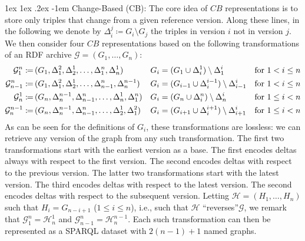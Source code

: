 \documentclass{llncs}
\makeatletter
\renewcommand\paragraph{\@startsection{paragraph}{4}{\z@}%
	{1ex \@plus1ex \@minus.2ex}%
	{-1em}%
	{\normalfont\normalsize\itshape}}
\newcommand{\da}{\ensuremath{:\nolinebreak\mkern-1.2mu\nolinebreak=}}
\makeatother
\begin{document}
\paragraph{Change-Based (CB):} The core idea of $CB$ representations is to store only triples that change from a given reference version. Along these lines, in the following we denote by $\Delta_{i}^j \coloneqq G_i \setminus G_j$ the triples in version $i$ not in version $j$. We then consider four $CB$ representations based on the following transformations of an RDF archive $\mathcal{G} = (G_1,\ldots,G_n)$:
%
{\footnotesize
\begin{align*}
\mathcal{G}^n_1 \da\,& (G_1,\Delta_1^2,\Delta_2^1,\ldots,\Delta_1^n,\Delta_n^1) & G_i & = (G_1 \cup \Delta_i^1) \setminus \Delta_1^i & \text{for }1 < i \leq n\\
\mathcal{G}^n_{n-1} \da\,& (G_1,\Delta_1^2,\Delta_2^1,\ldots,\Delta_{n-1}^n,\Delta_n^{n-1}) & G_i & = (G_{i-1} \cup \Delta_i^{i-1}) \setminus \Delta_{i-1}^i & \text{for }1 < i \leq n \\
\mathcal{G}^1_n \da\,& (G_n,\Delta_n^{n-1},\Delta_{n-1}^n,\ldots,\Delta_n^1,\Delta_1^n) & G_i & = (G_n \cup \Delta_i^n) \setminus \Delta_n^i & \text{for }1 \leq i < n \\
\mathcal{G}^{n-1}_n \da\,& (G_n,\Delta_n^{n-1},\Delta_{n-1}^n,\ldots,\Delta_2^1,\Delta_1^2) & G_i & = (G_{i+1} \cup \Delta_i^{i+1}) \setminus \Delta_{i+1}^i & \text{for }1 \leq i < n
\end{align*}%
}%
%
As can be seen for the definitions of $G_i$, these transformations are lossless: we can retrieve any version of the graph from any such transformation. The first two transformations start with the earliest version as a base. The first encodes deltas always with respect to the first version. The second encodes deltas with respect to the previous version. The latter two transformations start with the latest version. The third encodes deltas with respect to the latest version. The second encodes deltas with respect to the subsequent version. Letting $\mathcal{H} = (H_1,\ldots,H_n)$ such that $H_i = G_{n-i+1}$ ($1 \leq i \leq n$), i.e., such that $\mathcal{H}$ ``reverses''$\mathcal{G}$, we remark that $\mathcal{G}^n_1 = \mathcal{H}^1_n$ and $\mathcal{G}^n_{n-1} = \mathcal{H}^{n-1}_n$. Each such transformation can then be represented as a SPARQL dataset with $2(n-1)+1$ named graphs.
\end{document}
